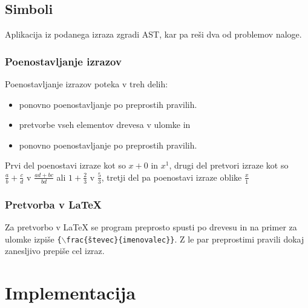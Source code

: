 \documentclass[12pt,titlepage]{report}
\begin{document}
	\section{Simboli}
	\label{symbol}
		Aplikacija iz podanega izraza zgradi AST, kar pa reši dva od problemov naloge.
			\subsection{Poenostavljanje izrazov}
				Poenostavljanje izrazov poteka v treh delih:
				\begin{itemize}
					\item ponovno poenostavljanje po preprostih pravilih.
					\item pretvorbe vseh elementov drevesa v ulomke in
					\item ponovno poenostavljanje po preprostih pravilih.
				\end{itemize}
				Prvi del poenostavi izraze kot so $ x + 0 $ in $ x^1 $, drugi del pretvori izraze kot so $ \frac{a}{b} + \frac{c}{d} $ v $ \frac{ad + bc}{bd} $ ali $ 1 + \frac{2}{3} $ v $ \frac{5}{3} $, tretji del pa poenostavi izraze oblike $ \frac{x}{1} $
			\subsection{Pretvorba v \LaTeX{}}
				Za pretvorbo v \LaTeX{} se program preprosto spusti po drevesu in na primer za ulomke izpiše \texttt{\{$\backslash$frac\{števec\}\{imenovalec\}\}}. Z le par preprostimi pravili dokaj zanesljivo prepiše cel izraz.
				
\chapter{Implementacija}
\label{impl}
\end{document}

